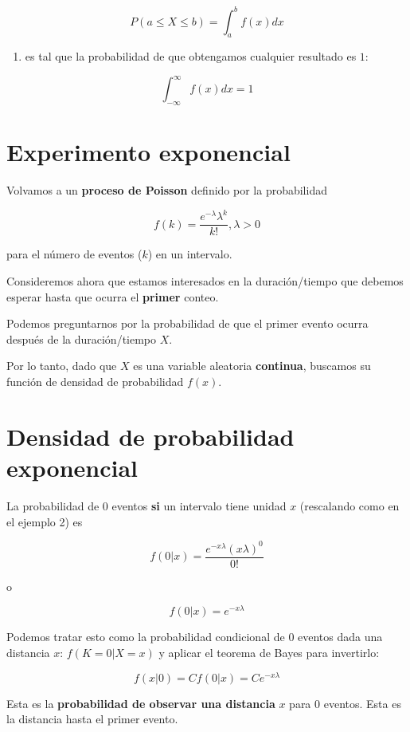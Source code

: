 \documentclass[
]{book}
\providecommand{\tightlist}{%
  \setlength{\itemsep}{0pt}\setlength{\parskip}{0pt}}
\begin{document}
\[P(a\leq X \leq b)=\int_{a}^{b} f(x) dx\]

\begin{enumerate}
\def\labelenumi{\arabic{enumi})}
\setcounter{enumi}{2}
\tightlist
\item
  es tal que la probabilidad de que obtengamos cualquier resultado es \(1\):
\end{enumerate}

\[\int_{-\infty}^{\infty} f(x) dx = 1\]

\hypertarget{experimento-exponencial}{%
\section{Experimento exponencial}\label{experimento-exponencial}}

Volvamos a un \textbf{proceso de Poisson} definido por la probabilidad

\[f(k)=\frac{e^{-\lambda}\lambda^k}{k!}, \lambda>0\]

para el número de eventos (\(k\)) en un intervalo.

Consideremos ahora que estamos interesados en la duración/tiempo que debemos esperar hasta que ocurra el \textbf{primer} conteo.

Podemos preguntarnos por la probabilidad de que el primer evento ocurra después de la duración/tiempo \(X\).

Por lo tanto, dado que \(X\) es una variable aleatoria \textbf{continua}, buscamos su función de densidad de probabilidad \(f(x)\).

\hypertarget{densidad-de-probabilidad-exponencial}{%
\section{Densidad de probabilidad exponencial}\label{densidad-de-probabilidad-exponencial}}

La probabilidad de \(0\) eventos \textbf{si} un intervalo tiene unidad \(x\) (rescalando como en el ejemplo 2) es

\[f(0|x)=\frac{e^{-x\lambda}(x\lambda)^0}{0!}\]

o

\[f(0|x)=e^{-x\lambda}\]

Podemos tratar esto como la probabilidad condicional de \(0\) eventos dada una distancia \(x\): \(f(K=0|X=x)\) y aplicar el teorema de Bayes para invertirlo:

\[f(x|0)=C f(0|x)=C e^{-x\lambda}\]

Esta es la \textbf{probabilidad de observar una distancia} \(x\) para \(0\) eventos. Esta es la distancia hasta el primer evento.
\end{document}
